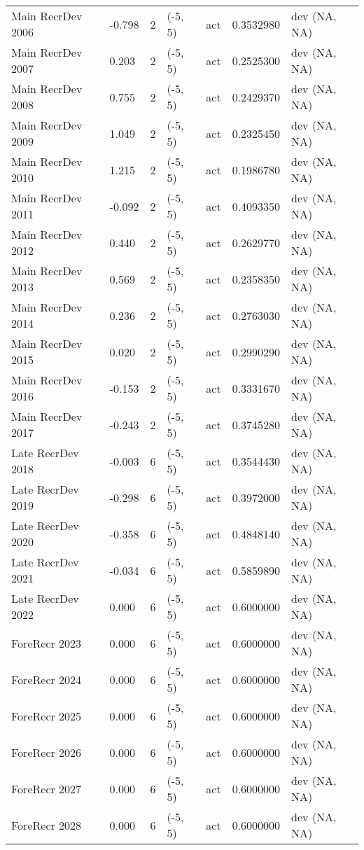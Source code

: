 \documentclass[11pt,
  english,
  letterpaper,
]{article}
\begin{document}
\begin{landscape}
\begin{longtable}[t]{>{\raggedright\arraybackslash}p{7cm}lllll>{\raggedright\arraybackslash}p{4cm}}
Main RecrDev 2006 & -0.798 & 2 & (-5, 5) & act & 0.3532980 & dev (NA, NA)\\
Main RecrDev 2007 & 0.203 & 2 & (-5, 5) & act & 0.2525300 & dev (NA, NA)\\
Main RecrDev 2008 & 0.755 & 2 & (-5, 5) & act & 0.2429370 & dev (NA, NA)\\
Main RecrDev 2009 & 1.049 & 2 & (-5, 5) & act & 0.2325450 & dev (NA, NA)\\
Main RecrDev 2010 & 1.215 & 2 & (-5, 5) & act & 0.1986780 & dev (NA, NA)\\
Main RecrDev 2011 & -0.092 & 2 & (-5, 5) & act & 0.4093350 & dev (NA, NA)\\
Main RecrDev 2012 & 0.440 & 2 & (-5, 5) & act & 0.2629770 & dev (NA, NA)\\
Main RecrDev 2013 & 0.569 & 2 & (-5, 5) & act & 0.2358350 & dev (NA, NA)\\
Main RecrDev 2014 & 0.236 & 2 & (-5, 5) & act & 0.2763030 & dev (NA, NA)\\
Main RecrDev 2015 & 0.020 & 2 & (-5, 5) & act & 0.2990290 & dev (NA, NA)\\
Main RecrDev 2016 & -0.153 & 2 & (-5, 5) & act & 0.3331670 & dev (NA, NA)\\
Main RecrDev 2017 & -0.243 & 2 & (-5, 5) & act & 0.3745280 & dev (NA, NA)\\
Late RecrDev 2018 & -0.003 & 6 & (-5, 5) & act & 0.3544430 & dev (NA, NA)\\
Late RecrDev 2019 & -0.298 & 6 & (-5, 5) & act & 0.3972000 & dev (NA, NA)\\
Late RecrDev 2020 & -0.358 & 6 & (-5, 5) & act & 0.4848140 & dev (NA, NA)\\
Late RecrDev 2021 & -0.034 & 6 & (-5, 5) & act & 0.5859890 & dev (NA, NA)\\
Late RecrDev 2022 & 0.000 & 6 & (-5, 5) & act & 0.6000000 & dev (NA, NA)\\
ForeRecr 2023 & 0.000 & 6 & (-5, 5) & act & 0.6000000 & dev (NA, NA)\\
ForeRecr 2024 & 0.000 & 6 & (-5, 5) & act & 0.6000000 & dev (NA, NA)\\
ForeRecr 2025 & 0.000 & 6 & (-5, 5) & act & 0.6000000 & dev (NA, NA)\\
ForeRecr 2026 & 0.000 & 6 & (-5, 5) & act & 0.6000000 & dev (NA, NA)\\
ForeRecr 2027 & 0.000 & 6 & (-5, 5) & act & 0.6000000 & dev (NA, NA)\\
ForeRecr 2028 & 0.000 & 6 & (-5, 5) & act & 0.6000000 & dev (NA, NA)\\

\end{longtable}
\end{landscape}
\end{document}
